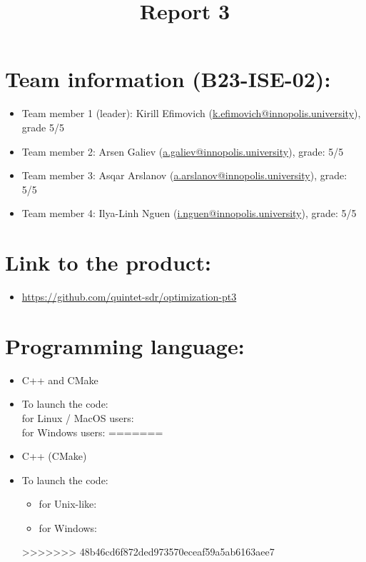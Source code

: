 \documentclass{article}
\title{\textbf{Report 3}}
\author{}
\date{}
\begin{document}
\maketitle

\thispagestyle{fancy}

\section*{Team information (B23-ISE-02):}
\begin{itemize}
\item Team member 1 (leader): Kirill Efimovich (\href{mailto:k.efimovich@innopolis.university}{k.efimovich@innopolis.university}), grade 5/5
\item Team member 2: Arsen Galiev (\href{mailto:a.galiev@innopolis.university}{a.galiev@innopolis.university}), grade: 5/5
\item Team member 3: Asqar Arslanov (\href{mailto:a.arslanov@innopolis.university}{a.arslanov@innopolis.university}), grade: 5/5
\item Team member 4: Ilya-Linh Nguen (\href{mailto:i.nguen@innopolis.university}{i.nguen@innopolis.university}), grade: 5/5
\end{itemize}

\section*{Link to the product:}

\begin{itemize}
\item \url{https://github.com/quintet-sdr/optimization-pt3}
\end{itemize}

\section*{Programming language:}

\begin{itemize}
<<<<<<< HEAD
\item C++ and CMake
\item To launch the code: \\
for Linux / MacOS users:  \\
for Windows users: 
=======
    \item C++ (CMake)
    \item To launch the code:
          \begin{itemize}
              \item for Unix-like:  \\
              \item for Windows: 
          \end{itemize}
>>>>>>> 48b46cd6f872ded973570eceaf59a5ab6163aee7
\end{itemize}
\end{document}
